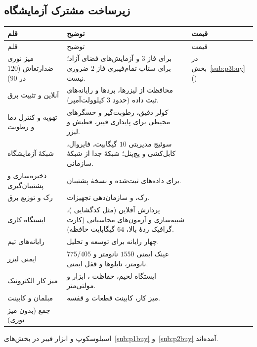 \subsection{زیرساخت مشترک آزمایشگاه}
\begin{longtable}{R{3.9cm}R{7.4cm}C{3.1cm}}
\toprule {} قلم & توضیح & قیمت \\ \midrule
\endfirsthead
\toprule {} قلم & توضیح & قیمت \\ \midrule
\endhead
میز نوری ضدارتعاش ($120$ در $90$) & برای فاز $3$ و آزمایش‌های فضای آزاد؛ برای ستاپ تمام‌فیبری فاز $2$ ضروری نیست\cite{cvreport}. & در بخش~\ref{sub:p3buy} () \\
 آنلاین و تثبیت برق & محافظت از لیزرها، بردها و رایانه‌های ثبت داده (حدود $3$ کیلوولت‌آمپر). &  \\
تهویه و کنترل دما و رطوبت & کولر دقیق، رطوبت‌گیر و حسگرهای محیطی برای پایداری فیبر، قطبش و لیزر. &  \\
شبکهٔ آزمایشگاه & سوئیچ مدیریتی $10$ گیگابیت، فایروال، کابل‌کشی و پچ‌پنل؛ شبکهٔ جدا از شبکهٔ سازمانی. &  \\
ذخیره‌سازی و پشتیبان‌گیری &  برای داده‌های ثبت‌شده و نسخهٔ پشتیبان. &  \\
رک و توزیع برق & رک،  و سازمان‌دهی تجهیزات. &  \\
ایستگاه کاری  & پردازش آفلاین  (مثل کدگشایی )، شبیه‌سازی و آزمون‌های محاسباتی (کارت گرافیک ردهٔ بالا، $64$ گیگابایت حافظه). &  \\
رایانه‌های تیم & چهار رایانه برای توسعه و تحلیل. &  \\
ایمنی لیزر & عینک ایمنی $1550$ نانومتر و $405$/$775$ نانومتر، تابلوها و قفل ایمنی. &  \\
میز کار الکترونیک & ایستگاه لحیم، حفاظت ، ابزار و مولتی‌متر. &  \\
مبلمان و کابینت & میز کار، کابینت قطعات و قفسه. &  \\
\midrule جمع (بدون میز نوری) & &  \\
\bottomrule\end{longtable}
اسیلوسکوپ و ابزار فیبر در بخش‌های~\ref{sub:p1buy} و~\ref{sub:p2buy} آمده‌اند.
